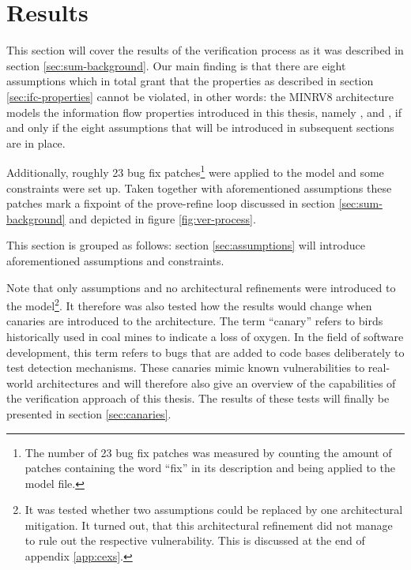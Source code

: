 
\chapter{Results}
\label{chp:results}

This section will cover the results of the verification process as it was described in section \ref{sec:sum-background}.
Our main finding is that there are eight assumptions which in total grant that the properties as described in section \ref{sec:ifc-properties} cannot be violated, in other words: the MINRV8 architecture models the information flow properties introduced in this thesis, namely ,  and , if and only if the eight assumptions that will be introduced in subsequent sections are in place.

Additionally, roughly 23 bug fix patches\footnote{%
    The number of 23 bug fix patches was measured by counting the amount of patches containing the word \enquote{fix} in its description and being applied to the model file.
} were applied to the model and some  constraints were set up.
Taken together with aforementioned assumptions these patches mark a fixpoint of the prove-refine loop discussed in section \ref{sec:sum-background} and depicted in figure \ref{fig:ver-process}.

This section is grouped as follows: section \ref{sec:assumptions} will introduce aforementioned assumptions and  constraints.

Note that only assumptions and no architectural refinements were introduced to the model\footnote{%
    It was tested whether two assumptions could be replaced by one architectural mitigation.
    It turned out, that this architectural refinement did not manage to rule out the respective vulnerability.
    This is discussed at the end of appendix \ref{app:cexs}.
}.
It therefore was also tested how the results would change when canaries are introduced to the architecture.
The term \enquote{canary} refers to birds historically used in coal mines to indicate a loss of oxygen.
In the field of software development, this term refers to bugs that are added to code bases deliberately to test detection mechanisms.
These canaries mimic known vulnerabilities to real-world architectures and will therefore also give an overview of the capabilities of the verification approach of this thesis.
The results of these tests will finally be presented in section \ref{sec:canaries}.

